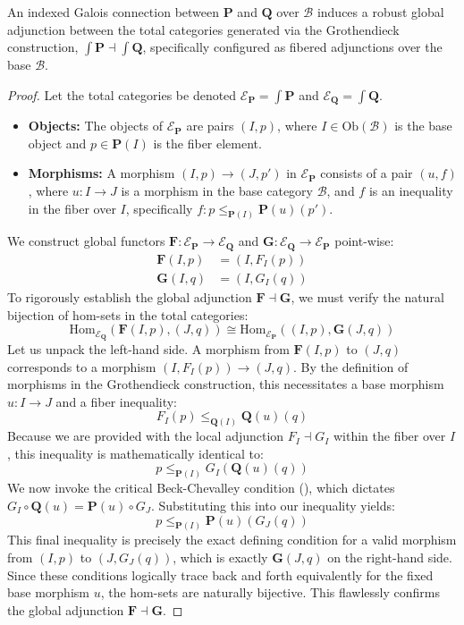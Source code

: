 \begin{theorem}
An indexed Galois connection between $\mathbf{P}$ and $\mathbf{Q}$ over $\mathcal{B}$ induces a robust global adjunction between the total categories generated via the Grothendieck construction, $\int \mathbf{P} \dashv \int \mathbf{Q}$, specifically configured as fibered adjunctions over the base $\mathcal{B}$.
\end{theorem}
\begin{proof}
Let the total categories be denoted $\mathcal{E}_{\mathbf{P}} = \int \mathbf{P}$ and $\mathcal{E}_{\mathbf{Q}} = \int \mathbf{Q}$.
\begin{itemize}
    \item \textbf{Objects:} The objects of $\mathcal{E}_{\mathbf{P}}$ are pairs $(I, p)$, where $I \in \text{Ob}(\mathcal{B})$ is the base object and $p \in \mathbf{P}(I)$ is the fiber element.
    \item \textbf{Morphisms:} A morphism $(I, p) \to (J, p')$ in $\mathcal{E}_{\mathbf{P}}$ consists of a pair $(u, f)$, where $u: I \to J$ is a morphism in the base category $\mathcal{B}$, and $f$ is an inequality in the fiber over $I$, specifically $f: p \leq_{\mathbf{P}(I)} \mathbf{P}(u)(p')$.
\end{itemize}

We construct global functors $\mathbf{F}: \mathcal{E}_{\mathbf{P}} \to \mathcal{E}_{\mathbf{Q}}$ and $\mathbf{G}: \mathcal{E}_{\mathbf{Q}} \to \mathcal{E}_{\mathbf{P}}$ point-wise:
\begin{align*}
\mathbf{F}(I, p) &= (I, F_I(p)) \\
\mathbf{G}(I, q) &= (I, G_I(q))
\end{align*}
To rigorously establish the global adjunction $\mathbf{F} \dashv \mathbf{G}$, we must verify the natural bijection of hom-sets in the total categories:
\[ \text{Hom}_{\mathcal{E}_{\mathbf{Q}}}(\mathbf{F}(I, p), (J, q)) \cong \text{Hom}_{\mathcal{E}_{\mathbf{P}}}((I, p), \mathbf{G}(J, q)) \]
Let us unpack the left-hand side. A morphism from $\mathbf{F}(I, p)$ to $(J, q)$ corresponds to a morphism $(I, F_I(p)) \to (J, q)$. By the definition of morphisms in the Grothendieck construction, this necessitates a base morphism $u: I \to J$ and a fiber inequality:
\[ F_I(p) \leq_{\mathbf{Q}(I)} \mathbf{Q}(u)(q) \]
Because we are provided with the local adjunction $F_I \dashv G_I$ within the fiber over $I$, this inequality is mathematically identical to:
\[ p \leq_{\mathbf{P}(I)} G_I(\mathbf{Q}(u)(q)) \]
We now invoke the critical Beck-Chevalley condition (), which dictates $G_I \circ \mathbf{Q}(u) = \mathbf{P}(u) \circ G_J$. Substituting this into our inequality yields:
\[ p \leq_{\mathbf{P}(I)} \mathbf{P}(u)(G_J(q)) \]
This final inequality is precisely the exact defining condition for a valid morphism from $(I, p)$ to $(J, G_J(q))$, which is exactly $\mathbf{G}(J, q)$ on the right-hand side.
Since these conditions logically trace back and forth equivalently for the fixed base morphism $u$, the hom-sets are naturally bijective. This flawlessly confirms the global adjunction $\mathbf{F} \dashv \mathbf{G}$.
\end{proof}

